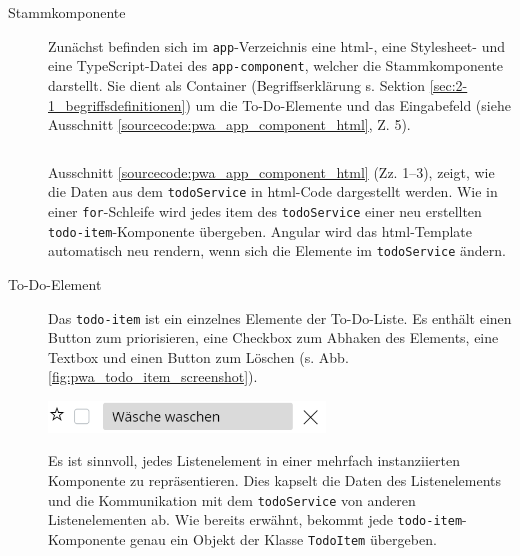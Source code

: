 \begin{description}
	\item[Stammkomponente] Zunächst befinden sich im \texttt{app}-Verzeichnis eine \ac{html}-, eine Stylesheet- und eine TypeScript-Datei des \texttt{app-component}, welcher die Stammkomponente darstellt. Sie dient als Container (Begriffserklärung s. Sektion \ref{sec:2-1_begriffsdefinitionen}) um die To-Do-Elemente und das Eingabefeld (siehe Ausschnitt \ref{sourcecode:pwa_app_component_html}, Z. 5).
	
	\begin{minipage}{\linewidth}
		\inputminted{ng2}{sourcecode/pwa_app_component.html}
		\label{sourcecode:pwa_app_component_html}
	\end{minipage}

	Ausschnitt \ref{sourcecode:pwa_app_component_html} (Zz. 1--3), zeigt, wie die Daten aus dem \texttt{todoService} in \ac{html}-Code dargestellt werden. Wie in einer \texttt{for}-Schleife wird jedes item des \texttt{todoService} einer neu erstellten \texttt{todo-item}-Komponente übergeben.
	Angular wird das \ac{html}-Template automatisch neu rendern, wenn sich die Elemente im \texttt{todoService} ändern.	
	
	\item[To-Do-Element] 
	Das \texttt{todo-item} ist ein einzelnes Elemente der To-Do-Liste. Es enthält einen Button zum priorisieren, eine Checkbox zum Abhaken des Elements, eine Textbox und einen Button zum Löschen (s. Abb. \ref{fig:pwa_todo_item_screenshot}).
	\newpage
	\begin{minipage}{\linewidth}
		\includegraphics[width=0.6\textwidth]{img/pwa_todo_item.PNG}
		\centering
		\label{fig:pwa_todo_item_screenshot}
	\end{minipage}
	
	Es ist sinnvoll, jedes Listenelement in einer mehrfach instanziierten Komponente zu repräsentieren. Dies kapselt die Daten des Listenelements und die Kommunikation mit dem \texttt{todoService} von anderen Listenelementen ab. Wie bereits erwähnt, bekommt jede \texttt{todo-item}-Komponente genau ein Objekt der Klasse \texttt{TodoItem} übergeben.
	
	\begin{minipage}{\linewidth}
		\inputminted{ng2}{sourcecode/pwa_todo_item.html}
		\label{sourcecode:pwa_todo_item_html}
	\end{minipage}


\end{description}
